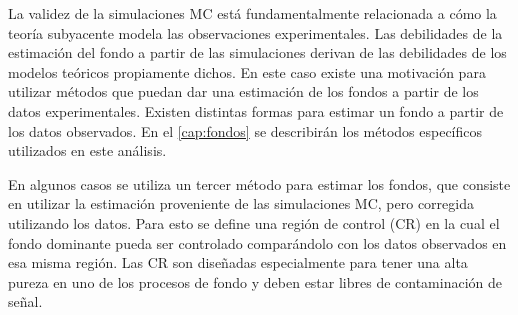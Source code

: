 





La validez de la simulaciones MC está fundamentalmente relacionada a cómo la
teoría subyacente modela las observaciones experimentales. Las debilidades de la
estimación del fondo a partir de las simulaciones derivan de las debilidades de
los modelos teóricos propiamente dichos. En este caso existe una motivación para
utilizar métodos que puedan dar una estimación de los fondos a partir de los
datos experimentales. Existen distintas formas para estimar un fondo a partir de
los datos observados. En el \cref{cap:fondos} se describirán los métodos
específicos utilizados en este análisis.

En algunos casos se utiliza un tercer método para estimar los fondos, que consiste en
utilizar la estimación proveniente de las simulaciones MC, pero corregida
utilizando los datos. Para esto se define una región de control (CR) en
la cual el fondo dominante pueda ser controlado comparándolo con los datos
observados en esa misma región. Las CR son diseñadas especialmente para tener
una alta pureza en uno de los procesos de fondo y deben estar libres de
contaminación de señal.

